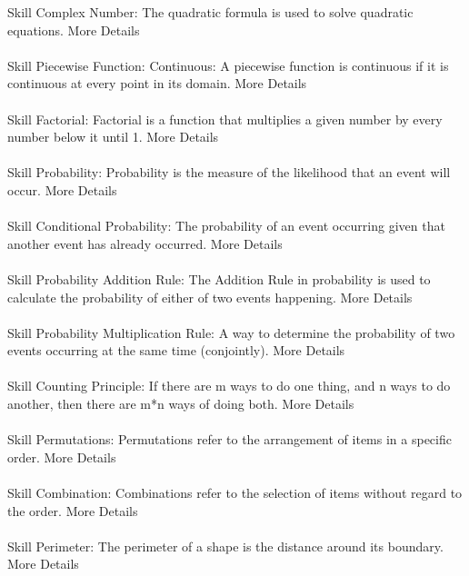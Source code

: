 \documentclass{article} \usepackage{arxiv}
\begin{document}
\begin{tcolorbox}[title = {Skills for MATH}, colback = Apricot!25!white, colframe = BrickRed!75!black,fontupper =\fontsize{7.5pt}{6pt}\selectfont]
Skill Complex Number: The quadratic formula is used to solve quadratic equations. More Details\\ \\

Skill Piecewise Function: Continuous: A piecewise function is continuous if it is continuous at every point in its domain. More Details\\ \\

Skill Factorial:  Factorial is a function that multiplies a given number by every number below it until 1. More Details\\ \\

Skill Probability:   Probability is the measure of the likelihood that an event will occur. More Details\\ \\

Skill Conditional Probability: The probability of an event occurring given that another event has already occurred.  More Details\\ \\

Skill Probability Addition Rule: The Addition Rule in probability is used to calculate the probability of either of two events happening. More Details\\ \\

Skill Probability Multiplication Rule: A way to determine the probability of two events occurring at the same time (conjointly). More Details\\ \\

Skill Counting Principle: If there are m ways to do one thing, and n ways to do another, then there are m*n ways of doing both. More Details\\ \\

Skill Permutations: Permutations refer to the arrangement of items in a specific order. More Details\\ \\

Skill Combination:  Combinations refer to the selection of items without regard to the order. More Details\\ \\

Skill Perimeter:  The perimeter of a shape is the distance around its boundary. More Details\\ \\


\end{tcolorbox}
\end{document}

